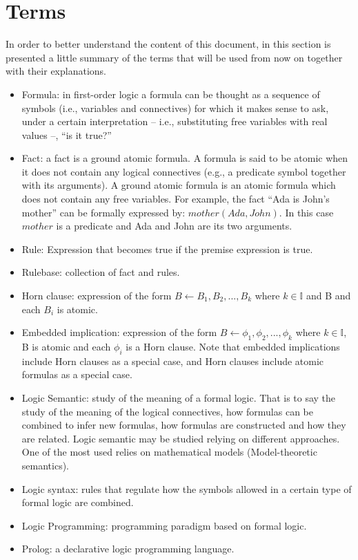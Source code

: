 \section{Terms}
\label{sec:terms}
In order to better understand the content of this document, in this
section is presented a little summary of the terms that will be used from now on together with
their explanations.

\begin{itemize}
  \item Formula: in first-order logic a formula can be thought as a sequence of symbols
    (i.e., variables and connectives) for which it makes sense to ask, under a certain
    interpretation -- i.e., substituting free variables with real values --, ``is it true?''
  \item Fact: a fact is a ground atomic formula.  A formula is said to be atomic when
    it does not contain any logical connectives (e.g., a predicate symbol together with its arguments).
    A ground atomic formula is an atomic formula which does not contain
    any free variables. For example, the fact ``Ada is John's mother'' can be formally expressed
    by: $mother(Ada, John)$. In this case $mother$ is a predicate and Ada and John are its two
    arguments.
  \item Rule: Expression that becomes true if the premise expression is true.
  \item Rulebase: collection of fact and rules.
  \item Horn clause: expression of the form $B \leftarrow B_1,B_2,...,B_k$ where $k \in \mathbb{I}$ and
    B and each $B_i$ is atomic.
  \item Embedded implication: expression of the form $B \leftarrow \phi_1,\phi_2,...,\phi_k$
    where $k \in \mathbb{I}$, B is atomic and each $\phi_i$ is a Horn clause.
    Note that embedded implications include Horn clauses as a special case, and Horn
    clauses include atomic formulas as a special case.
  \item Logic Semantic: study of the meaning of a formal logic. That is to say the study
    of the meaning of the logical connectives, how formulas can be combined to infer new formulas,
    how formulas are constructed and how they are related.
    Logic semantic may be studied relying on different approaches. One of the most
    used relies on mathematical models (Model-theoretic semantics).
  \item Logic syntax: rules that regulate how the symbols allowed in a certain type
    of formal logic are combined.
  \item Logic Programming:  programming paradigm based on formal logic.
  \item Prolog: a declarative logic programming language.
\end{itemize}
